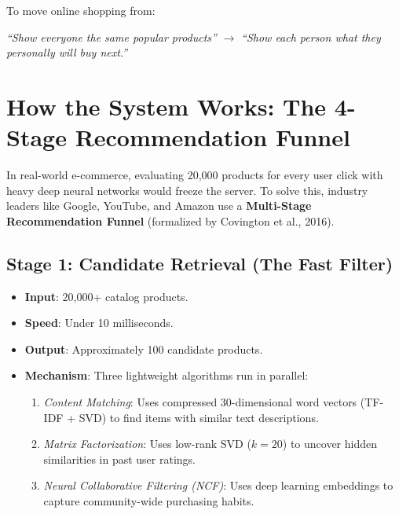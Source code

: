 \documentclass[11pt,a4paper]{article}
\begin{document}
\begin{tcolorbox}[title=The Core Mission of SmartBasket Neo]
To move online shopping from:
\begin{center}
\textit{``Show everyone the same popular products''} $\longrightarrow$ \textit{``Show each person what they personally will buy next.''}
\end{center}
\end{tcolorbox}

\section{How the System Works: The 4-Stage Recommendation Funnel}

In real-world e-commerce, evaluating 20,000 products for every user click with heavy deep neural networks would freeze the server. To solve this, industry leaders like Google, YouTube, and Amazon use a \textbf{Multi-Stage Recommendation Funnel} (formalized by Covington et al., 2016).

\subsection{Stage 1: Candidate Retrieval (The Fast Filter)}
\begin{itemize}
    \item \textbf{Input}: 20,000+ catalog products.
    \item \textbf{Speed}: Under 10 milliseconds.
    \item \textbf{Output}: Approximately 100 candidate products.
    \item \textbf{Mechanism}: Three lightweight algorithms run in parallel:
    \begin{enumerate}[noitemsep]
        \item \textit{Content Matching}: Uses compressed 30-dimensional word vectors (TF-IDF + SVD) to find items with similar text descriptions.
        \item \textit{Matrix Factorization}: Uses low-rank SVD ($k=20$) to uncover hidden similarities in past user ratings.
        \item \textit{Neural Collaborative Filtering (NCF)}: Uses deep learning embeddings to capture community-wide purchasing habits.
    \end{enumerate}
\end{itemize}
\end{document}

